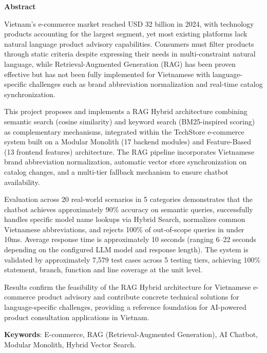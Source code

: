 \begin{center}
\textbf{\large{Abstract}}
\end{center}

\begin{small}

Vietnam's e-commerce market reached USD 32 billion in 2024, with technology products accounting for the largest segment, yet most existing platforms lack natural language product advisory capabilities. Consumers must filter products through static criteria despite expressing their needs in multi-constraint natural language, while Retrieval-Augmented Generation (RAG) has been proven effective but has not been fully implemented for Vietnamese with language-specific challenges such as brand abbreviation normalization and real-time catalog synchronization.

This project proposes and implements a RAG Hybrid architecture combining semantic search (cosine similarity) and keyword search (BM25-inspired scoring) as complementary mechanisms, integrated within the TechStore e-commerce system built on a Modular Monolith (17 backend modules) and Feature-Based (13 frontend features) architecture. The RAG pipeline incorporates Vietnamese brand abbreviation normalization, automatic vector store synchronization on catalog changes, and a multi-tier fallback mechanism to ensure chatbot availability.

Evaluation across 20 real-world scenarios in 5 categories demonstrates that the chatbot achieves approximately 90\% accuracy on semantic queries, successfully handles specific model name lookups via Hybrid Search, normalizes common Vietnamese abbreviations, and rejects 100\% of out-of-scope queries in under 10ms. Average response time is approximately 10 seconds (ranging 6--22 seconds depending on the configured LLM model and response length). The system is validated by approximately 7,579 test cases across 5 testing tiers, achieving 100\% statement, branch, function and line coverage at the unit level.

Results confirm the feasibility of the RAG Hybrid architecture for Vietnamese e-commerce product advisory and contribute concrete technical solutions for language-specific challenges, providing a reference foundation for AI-powered product consultation applications in Vietnam.

\vspace*{0.5cm}
\textbf{Keywords}: E-commerce, RAG (Retrieval-Augmented Generation), AI Chatbot, Modular Monolith, Hybrid Vector Search.

\end{small}
